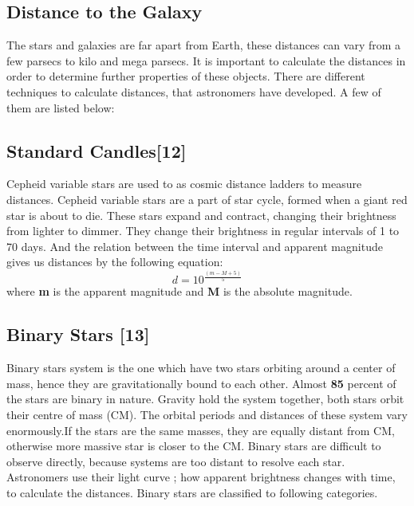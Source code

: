\subsection{Distance to the Galaxy}

The stars and galaxies are far apart from Earth, these distances can vary from a few parsecs to kilo and mega parsecs. It is important to calculate the distances in order to determine further properties of these objects. There are different techniques to calculate distances, that astronomers have developed.
A few of them are listed below:

\subsection{Standard Candles[12]}
 Cepheid variable stars are used to as cosmic distance ladders to measure distances. Cepheid variable stars are a part of star cycle, formed when a giant red star is about to die. These stars expand and contract, changing their brightness from lighter to dimmer.  They change their brightness in regular intervals of 1 to 70 days. And the relation between the time interval and apparent magnitude gives us distances by the following equation:
 \begin{equation}
 d= 10^{\frac{(m-M+5)}{5}}
 \end{equation}
where \textbf{m} is the apparent magnitude and \textbf{M} is the absolute magnitude.

\subsection*{Binary Stars [13]}

Binary stars system is the one which have two stars orbiting around a center of mass, hence they are gravitationally bound to each other. Almost \textbf{85} percent of the stars are binary in nature. Gravity hold the system together, both stars orbit their centre of mass (CM). The orbital periods and distances of these system vary enormously.If the stars are the same masses, they are equally distant from CM, otherwise more massive star is closer to the CM. Binary stars are difficult to observe directly, because systems are too distant to resolve each star. Astronomers use their light curve ; how apparent brightness changes with time, to calculate the distances. Binary stars are classified to following categories.

